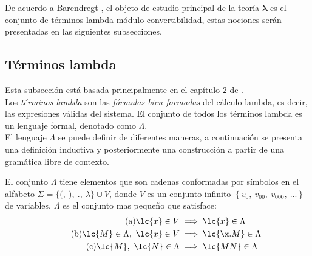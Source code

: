 De acuerdo a Barendregt \cite[p.~22]{Barendregt:Bible}, el objeto de estudio principal de la teoría \(\boldsymbol{\lambda}\) es el conjunto de términos lambda módulo convertibilidad, estas nociones serán presentadas en las siguientes subsecciones. \\

\subsection{Términos lambda}

Esta subsección está basada principalmente en el capítulo 2 de \cite{Barendregt:Bible}. \\

Los \emph{términos lambda} son las \emph{fórmulas bien formadas} del cálculo lambda, es decir, las expresiones válidas del sistema. El conjunto de todos los términos lambda es un lenguaje formal, denotado como \(\Lambda\). \\

El lenguaje \(\Lambda\) se puede definir de diferentes maneras, a continuación se presenta una definición inductiva y posteriormente una construcción a partir de una gramática libre de contexto. \\

\begin{defi} El conjunto \(\Lambda\) tiene elementos que son cadenas conformadas por símbolos en el alfabeto \(\Sigma = \{\texttt{(},\ \texttt{)},\ \texttt{.},\ \lambda\} \cup V\), donde \(V\) es un conjunto infinito \(\left\{ v_{0},\ v_{00},\ v_{000},\ ... \right\}\) de variables.  \(\Lambda\) es el conjunto mas pequeño que satisface:
  \label{definicion:terminoslambda1}
  \begin{subequations}
    \label{definicion:terminoslambda1:implicaciones}
    \begin{align}
      \label{definicion:terminoslambda1:atomos} \tag{a}
      \lc{x} \in V &\implies \lc{x} \in \Lambda
      \\
      \label{definicion:terminoslambda1:abstracciones} \tag{b}
      \lc{M} \in \Lambda,\ \lc{x} \in V &\implies \lc{\x.M} \in \Lambda
      \\
      \label{definicion:terminoslambda1:aplicaciones} \tag{c}
      \lc{M},\ \lc{N} \in \Lambda &\implies \lc{M N} \in \Lambda
    \end{align}
  \end{subequations}
\end{defi} \

